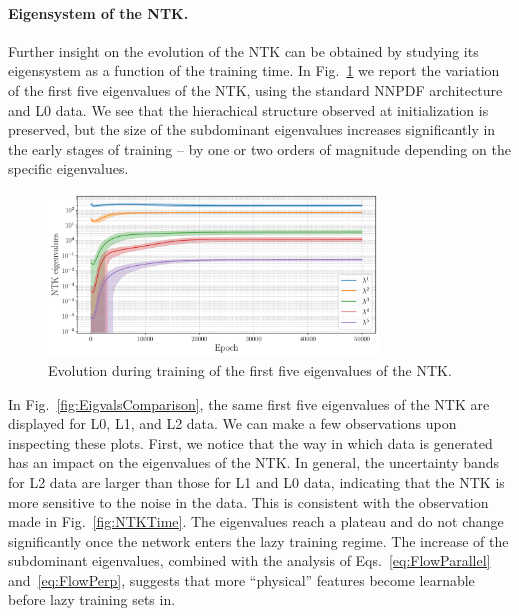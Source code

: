 \paragraph{Eigensystem of the NTK.}
Further insight on the evolution of the NTK can be obtained by studying its eigensystem as 
a function of the training time. 
In Fig.~\ref{fig:EigvalL0Training} we report the variation of the first five eigenvalues 
of the NTK, using the standard NNPDF architecture and L0 data. We see that the hierachical
structure observed at initialization is preserved, but the size of the subdominant eigenvalues
increases significantly in the early stages of training -- by one or two orders of magnitude depending on the 
specific eigenvalues. 
\begin{figure}[ht!]
  \centering  
  \includegraphics[width=0.78\textwidth]{plots/ntk_pheno/ntk_eigvals_single_plot_L0.pdf}  
  \caption{Evolution during training of the first five eigenvalues of the NTK.}
  \label{fig:EigvalL0Training}
\end{figure}
In Fig.~\ref{fig:EigvalsComparison}, the same first five eigenvalues of the NTK
are displayed for L0, L1, and L2 data. We can make a few observations upon
inspecting these plots. First, we notice that the way in which data is generated
has an impact on the eigenvalues of the NTK. In general, the uncertainty bands
for L2 data are larger than those for L1 and L0 data, indicating that the NTK is
more sensitive to the noise in the data. This is consistent with the observation
made in Fig.~\ref{fig:NTKTime}. 
The eigenvalues reach a plateau and do not change significantly once 
the network enters the lazy training regime. The increase of the subdominant eigenvalues, 
combined with the analysis of Eqs.~\eqref{eq:FlowParallel} and~\eqref{eq:FlowPerp}, 
suggests that more ``physical'' features become learnable before lazy training sets in. 

